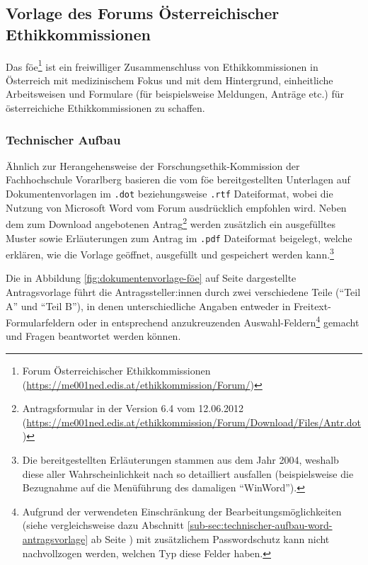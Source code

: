 \documentclass[a4paper,12pt,twoside]{scrreprt}
\begin{document}
\subsection{Vorlage des Forums Österreichischer Ethikkommissionen}
\label{sub-sec:vorlage-föe}

Das \ac{föe}\footnote{Forum Österreichischer Ethikkommissionen (\url{https://me001ned.edis.at/ethikkommission/Forum/})} ist ein freiwilliger Zusammenschluss von Ethikkommissionen in Österreich mit medizinischem Fokus und mit dem Hintergrund, einheitliche Arbeitsweisen und Formulare (für beispielsweise Meldungen, Anträge etc.) für österreichiche Ethikkommissionen zu schaffen. \cite{ethikkommission_der_medizinischen_universitat_graz_forum_2019}

\subsubsection*{Technischer Aufbau}
\label{sub-sub-sec:föe-technischer-aufbau}

Ähnlich zur Herangehensweise der Forschungsethik-Kommission der Fachhochschule Vorarlberg basieren die vom \ac{föe} bereitgestellten Unterlagen auf Dokumentenvorlagen im \texttt{.dot} beziehungsweise \texttt{.rtf} Dateiformat, wobei die Nutzung von Microsoft Word vom Forum ausdrücklich empfohlen wird. Neben dem zum Download angebotenen Antrag\footnote{Antragsformular in der Version 6.4 vom 12.06.2012 (\url{https://me001ned.edis.at/ethikkommission/Forum/Download/Files/Antr.dot})} werden zusätzlich ein ausgefülltes Muster sowie Erläuterungen zum Antrag im \texttt{.pdf} Dateiformat beigelegt, welche erklären, wie die Vorlage geöffnet, ausgefüllt und gespeichert werden kann.\footnote{Die bereitgestellten Erläuterungen stammen aus dem Jahr 2004, weshalb diese aller Wahrscheinlichkeit nach so detailliert ausfallen (beispielsweise die Bezugnahme auf die Menüführung des damaligen \enquote{WinWord}).} \cite{ethikkommission_der_medizinischen_universitat_graz_download_2012}

\medskip

Die in Abbildung \ref{fig:dokumentenvorlage-föe} auf Seite \pageref{fig:dokumentenvorlage-föe} dargestellte Antragsvorlage führt die Antragssteller:innen durch zwei verschiedene Teile (\enquote{Teil A} und \enquote{Teil B}), in denen unterschiedliche Angaben entweder in Freitext-Formularfeldern oder in entsprechend anzukreuzenden Auswahl-Feldern\footnote{Aufgrund der verwendeten Einschränkung der Bearbeitungsmöglichkeiten (siehe vergleichsweise dazu Abschnitt \ref{sub-sec:technischer-aufbau-word-antragsvorlage} ab Seite \pageref{sub-sec:technischer-aufbau-word-antragsvorlage}) mit zusätzlichem Passwordschutz kann nicht nachvollzogen werden, welchen Typ diese Felder haben.} gemacht und Fragen beantwortet werden können.
\end{document}
